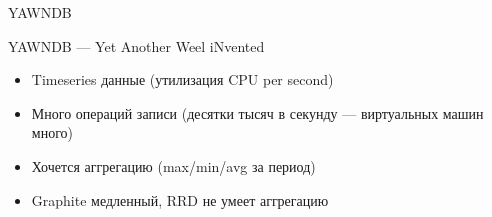 \documentclass[10pt]{beamer}
\begin{document}
\begin{frame}[plain]
\end{frame}

\begin{frame}
  \begin{center}
    \Large
    YAWNDB
  \end{center}
\end{frame}

\begin{frame}{YAWNDB — Yet Another Weel iNvented}
  \begin{itemize}
  \item Timeseries данные (утилизация CPU per second)
  \item Много операций записи (десятки тысяч в секунду — виртуальных машин много)
  \item Хочется аггрегацию (max/min/avg за период)
  \item Graphite медленный, RRD не умеет аггрегацию
  \end{itemize}
\end{frame}
\end{document}
